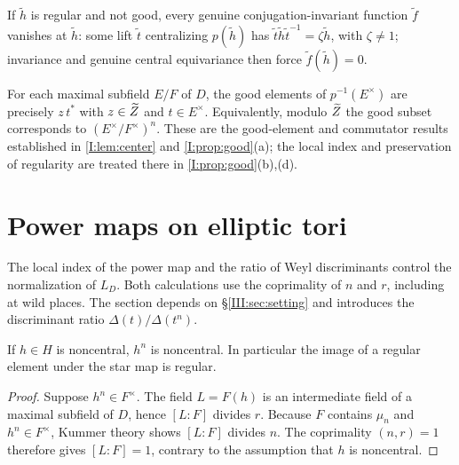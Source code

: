 \begin{remark}\label{III:rem:good-vanish}
If $\widetilde h$ is regular and not good, every genuine conjugation-invariant function $\widetilde f$ vanishes at $\widetilde h$: some lift $\widetilde t$ centralizing $p(\widetilde h)$ has $\widetilde t\widetilde h\widetilde t^{-1}=\zeta\widetilde h$, with $\zeta\neq1$; invariance and genuine central equivariance then force $\widetilde f(\widetilde h)=0$.
\end{remark}

\begin{proposition}\label{III:prop:good}
For each maximal subfield $E/F$ of $D$, the good elements of
$p^{-1}(E^\times)$ are precisely $z\,t^*$ with $z\in\widetilde Z$ and
$t\in E^\times$. Equivalently, modulo $\widetilde Z$ the good subset
corresponds to $(E^\times/F^\times)^n$. These are the good-element
and commutator results established in \cref{I:lem:center} and
\cref{I:prop:good}(a); the local index and preservation of regularity
are treated there in \cref{I:prop:good}(b),(d).
\end{proposition}

\section{Power maps on elliptic tori}\label{III:sec:power}
The local index of the power map and the ratio of Weyl discriminants
control the normalization of $L_D$. Both calculations use the
coprimality of $n$ and $r$, including at wild places. The section depends on \S\ref{III:sec:setting} and introduces the discriminant ratio $\Delta(t)/\Delta(t^n)$.
\begin{lemma}\label{III:lem:regular}
If $h\in H$ is noncentral, $h^n$ is noncentral. In particular the image of a regular element under the star map is regular.
\end{lemma}
\begin{proof}
Suppose $h^n\in F^\times$. The field $L=F(h)$ is an intermediate field of a maximal subfield of $D$, hence $[L:F]$ divides $r$. Because $F$ contains $\mu_n$ and $h^n\in F^\times$, Kummer theory shows $[L:F]$ divides $n$. The coprimality $(n,r)=1$ therefore gives $[L:F]=1$, contrary to the assumption that $h$ is noncentral.
\end{proof}

